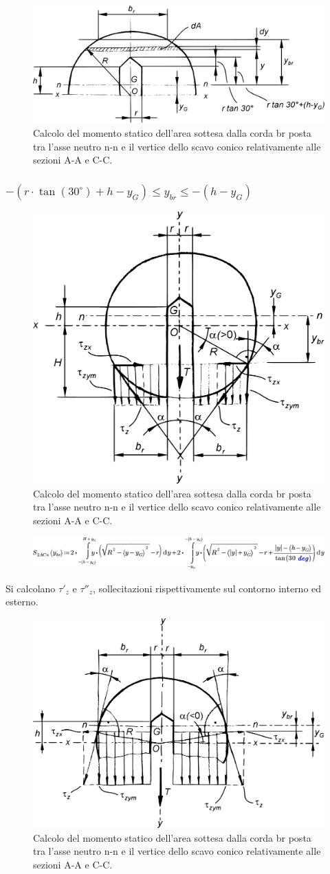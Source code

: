 \begin{figure}[H]
\centering
  \includegraphics[width=.45\textwidth]{imgs/Cap7/SezAsse8}
\caption{Calcolo del momento statico dell’area sottesa dalla corda br posta tra l’asse neutro n-n e il vertice dello scavo conico relativamente alle sezioni A-A e C-C.}
\label{fig:SezAsse8}
\end{figure}

\subsubsection{$-(r \cdot \tan(30^\circ)+h-y_G) \leq y_{br} \leq -(h-y_G)$}
\begin{figure}[H]
\centering
  \includegraphics[width=.45\textwidth]{imgs/Cap7/SezAsse9}
\caption{Calcolo del momento statico dell’area sottesa dalla corda br posta tra l’asse neutro n-n e il vertice dello scavo conico relativamente alle sezioni A-A e C-C.}
\label{fig:SezAsse9}
\end{figure}
\begin{figure}[H]
\centering
  \includegraphics[width=.75\textwidth]{imgs/MathAsse5_0}
\caption{}
\label{fig:MathAsse5_0}
\end{figure}
Si calcolano $\tau'_z$ e $\tau''_z$, sollecitazioni rispettivamente sul contorno interno ed esterno.
\begin{figure}[H]
\centering
  \includegraphics[width=.4\textwidth]{imgs/Cap7/SezAsse10}
\caption{Calcolo del momento statico dell’area sottesa dalla corda br posta tra l’asse neutro n-n e il vertice dello scavo conico relativamente alle sezioni A-A e C-C.}
\label{fig:SezAsse10}
\end{figure}
